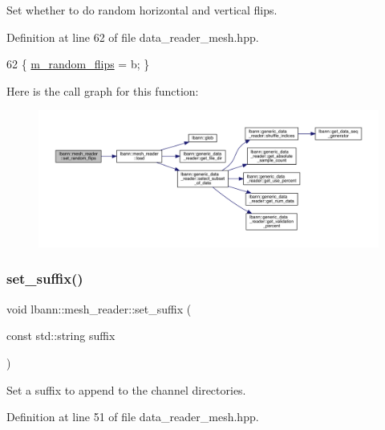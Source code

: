 Set whether to do random horizontal and vertical flips. 



Definition at line 62 of file data\+\_\+reader\+\_\+mesh.\+hpp.


\begin{DoxyCode}
62 \{ \hyperlink{classlbann_1_1mesh__reader_a0be20898f9c5d9b195587fb5fafc5d5a}{m\_random\_flips} = b; \}
\end{DoxyCode}
Here is the call graph for this function\+:\nopagebreak
\begin{figure}[H]
\begin{center}
\leavevmode
\includegraphics[width=350pt]{classlbann_1_1mesh__reader_a48eedb0d62f445c8ba6d07d2f22da722_cgraph}
\end{center}
\end{figure}
\mbox{\label{classlbann_1_1mesh__reader_ad8bbf0bcbbf9167328e290e7a56918a5}} 
\subsubsection{\texorpdfstring{set\+\_\+suffix()}{set\_suffix()}}
{\footnotesize\ttfamily void lbann\+::mesh\+\_\+reader\+::set\+\_\+suffix (\begin{DoxyParamCaption}\item[{const std\+::string}]{suffix }\end{DoxyParamCaption})\hspace{0.3cm}{\ttfamily [inline]}}



Set a suffix to append to the channel directories. 



Definition at line 51 of file data\+\_\+reader\+\_\+mesh.\+hpp.


